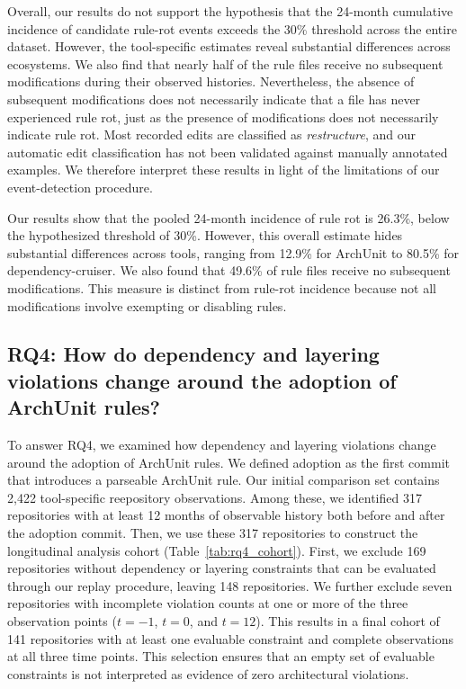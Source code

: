 Overall, our results do not support the hypothesis that the
24-month cumulative incidence of candidate rule-rot events
exceeds the 30\% threshold across the entire dataset.
However, the tool-specific estimates reveal substantial
differences across ecosystems. We also find that nearly
half of the rule files receive no subsequent modifications
during their observed histories. Nevertheless, the absence
of subsequent modifications does not necessarily indicate
that a file has never experienced rule rot, just as the
presence of modifications does not necessarily indicate
rule rot. Most recorded edits are classified as
\emph{restructure}, and our automatic edit classification
has not been validated against manually annotated examples.
We therefore interpret these results in light of the
limitations of our event-detection procedure.





\begin{keyfinding}
Our results show that the pooled 24-month incidence of
rule rot is 26.3\%, below the hypothesized threshold of
30\%. However, this overall estimate hides substantial
differences across tools, ranging from 12.9\% for ArchUnit
to 80.5\% for dependency-cruiser. We also found that
49.6\% of rule files receive no subsequent modifications.
This measure is distinct from rule-rot incidence because
not all modifications involve exempting or disabling rules.
\end{keyfinding}


\subsection{RQ4: How do dependency and layering violations change around the adoption of ArchUnit rules?}
\label{sec:rq4}

To answer RQ4, we examined how dependency and layering violations
change around the adoption of ArchUnit rules. We defined adoption
as the first commit that introduces a parseable ArchUnit rule.
Our initial comparison set contains 2,422 tool-specific reepository
observations. Among these, we identified 317 repositories with
at least 12 months of observable history both before and after
the adoption commit. Then, we use these 317 repositories to construct the 
longitudinal analysis cohort (Table~\ref{tab:rq4_cohort}). 
First, we exclude 169 repositories without dependency or 
layering constraints that can be evaluated through our 
replay procedure, leaving 148 repositories. We further 
exclude seven repositories with incomplete violation 
counts at one or more of the three observation points 
($t={-}1$, $t=0$, and $t=12$). This results in a final 
cohort of 141 repositories with at least one evaluable 
constraint and complete observations at all three time 
points. This selection ensures that an empty set of 
evaluable constraints is not interpreted as evidence 
of zero architectural violations.

